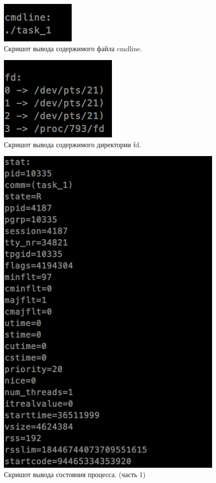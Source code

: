 \begin{figure}[H]
    \centering
    \includegraphics[scale=0.5]{data/image/cmdline.png}
    \caption{Скришот вывода содержимого файла cmdline.}
\end{figure}

\begin{figure}[H]
    \centering
    \includegraphics[scale=0.45]{data/image/fd.png}
    \caption{Скришот вывода содержимого директории fd.}
\end{figure}

\begin{figure}[H]
    \centering
    \includegraphics[scale=0.45]{data/image/stat_1.png}
    \caption{Скришот вывода состояния процесса. (часть 1)}
\end{figure}

